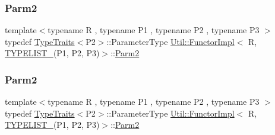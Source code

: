 \subsubsection{\texorpdfstring{Parm2}{Parm2}\hspace{0.1cm}{\footnotesize\ttfamily [2/3]}}
{\footnotesize\ttfamily template$<$typename R , typename P1 , typename P2 , typename P3 $>$ \\
typedef \mbox{\hyperlink{classUtil_1_1TypeTraits}{Type\+Traits}}$<$P2$>$\+::Parameter\+Type \mbox{\hyperlink{classUtil_1_1FunctorImpl}{Util\+::\+Functor\+Impl}}$<$ R, \mbox{\hyperlink{adat__devel__install_2include_2adat_2typelist_8h_a0309f68a543c5c0994f9edc0e56dc59f}{T\+Y\+P\+E\+L\+I\+S\+T\+\_}}(P1, P2, P3)$>$\+::\mbox{\hyperlink{structUtil_1_1Private_1_1FunctorImplBase_a554085cd798ef14838a59b528f0feb2e}{Parm2}}}

\mbox{\label{classUtil_1_1FunctorImpl_3_01R_00_01TYPELIST__3_07P1_00_01P2_00_01P3_08_4_a0f99a7ea311c3cc8934098ce9fe769c1}} 
\subsubsection{\texorpdfstring{Parm2}{Parm2}\hspace{0.1cm}{\footnotesize\ttfamily [3/3]}}
{\footnotesize\ttfamily template$<$typename R , typename P1 , typename P2 , typename P3 $>$ \\
typedef \mbox{\hyperlink{classUtil_1_1TypeTraits}{Type\+Traits}}$<$P2$>$\+::Parameter\+Type \mbox{\hyperlink{classUtil_1_1FunctorImpl}{Util\+::\+Functor\+Impl}}$<$ R, \mbox{\hyperlink{adat__devel__install_2include_2adat_2typelist_8h_a0309f68a543c5c0994f9edc0e56dc59f}{T\+Y\+P\+E\+L\+I\+S\+T\+\_}}(P1, P2, P3)$>$\+::\mbox{\hyperlink{structUtil_1_1Private_1_1FunctorImplBase_a554085cd798ef14838a59b528f0feb2e}{Parm2}}}

\mbox{\label{classUtil_1_1FunctorImpl_3_01R_00_01TYPELIST__3_07P1_00_01P2_00_01P3_08_4_a909cd0ef75e4c16e44eb5ae652144d00}} 

